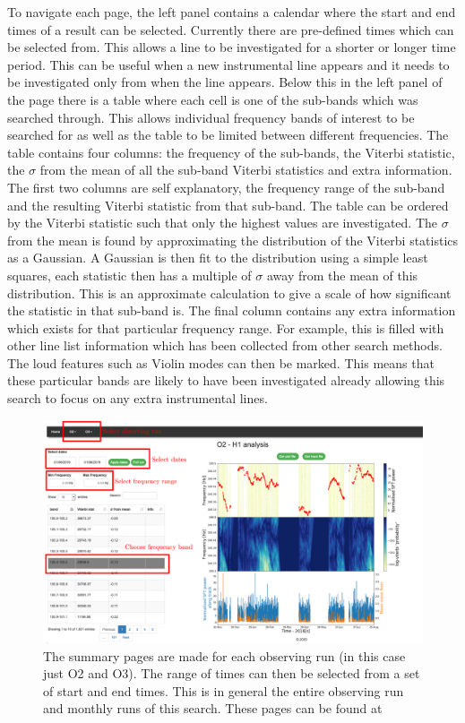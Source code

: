 To navigate each page, the left panel contains a calendar where the
start and end times of a result can be selected.  Currently there are
pre-defined times which can be selected from. This allows a line to be
investigated for a shorter or longer time period.  This can be useful when a
new instrumental line appears and it needs to be investigated only from when
the line appears.  Below this in the left panel of the page there is a table
where each cell is one of the sub-bands which was searched through. This allows
individual frequency bands of interest to be searched for as well as the table
to be limited between different frequencies.  The table contains four columns:
the frequency of the sub-bands, the Viterbi statistic, the $\sigma$ from the
mean of all the sub-band Viterbi statistics and extra information.  The first
two columns are self explanatory, the frequency range of the sub-band and the
resulting Viterbi statistic from that sub-band. The table can be ordered by the
Viterbi statistic such that only the highest values are investigated.  The
$\sigma$ from the mean is found by approximating the distribution of the
Viterbi statistics as a Gaussian.  A Gaussian is then fit to the distribution
using a simple least squares, each statistic then has a multiple of $\sigma$
away from the mean of this distribution.  This is an approximate calculation to
give a scale of how significant the statistic in that sub-band is.  The final
column contains any extra information which exists for that particular
frequency range.  For example, this is filled with other line list information
which has been collected from other search methods.  The loud features such as
Violin modes can then be marked. This means that these particular bands are
likely to have been investigated already allowing this search to focus on any
extra instrumental lines.
%
\begin{figure}
	\centering
	\includegraphics[width=\textwidth]{C6_detchar/summary_annot.pdf}
	\caption[Example summary page for SOAP search]{The summary pages are made for each observing run (in this case just O2 and O3). The range of times can then be selected from a set of start and end times. This is in general the entire observing run and monthly runs of this search. These pages can be found at \citep{bayleyHome}}
	\label{detchar:summary:plots}
\end{figure}
%

